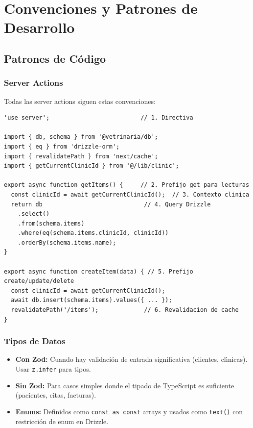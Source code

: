 \chapter{Convenciones y Patrones de Desarrollo}

\section{Patrones de C\'odigo}

\subsection{Server Actions}

Todas las server actions siguen estas convenciones:

\begin{lstlisting}[style=typescript, caption=Patron de Server Action]
'use server';                          // 1. Directiva

import { db, schema } from '@vetrinaria/db';
import { eq } from 'drizzle-orm';
import { revalidatePath } from 'next/cache';
import { getCurrentClinicId } from '@/lib/clinic';

export async function getItems() {     // 2. Prefijo get para lecturas
  const clinicId = await getCurrentClinicId();  // 3. Contexto clinica
  return db                             // 4. Query Drizzle
    .select()
    .from(schema.items)
    .where(eq(schema.items.clinicId, clinicId))
    .orderBy(schema.items.name);
}

export async function createItem(data) { // 5. Prefijo create/update/delete
  const clinicId = await getCurrentClinicId();
  await db.insert(schema.items).values({ ... });
  revalidatePath('/items');             // 6. Revalidacion de cache
}
\end{lstlisting}

\subsection{Tipos de Datos}

\begin{itemize}[leftmargin=*]
    \item \textbf{Con Zod:} Cuando hay validaci\'on de entrada significativa
          (clientes, cl\'{\i}nicas). Usar \texttt{z.infer} para tipos.
    \item \textbf{Sin Zod:} Para casos simples donde el tipado de TypeScript
          es suficiente (pacientes, citas, facturas).
    \item \textbf{Enums:} Definidos como \texttt{const as const} arrays y
          usados como \texttt{text()} con restricci\'on de enum en Drizzle.
\end{itemize}

